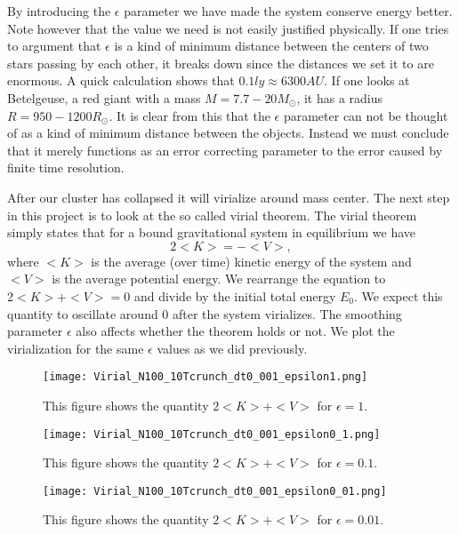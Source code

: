 \documentclass{aa}   %
\begin{document}
By introducing the $\epsilon$ parameter we have made the system conserve energy better. Note however that the value we need is not easily justified physically. If one tries to argument that $\epsilon$ is a kind of minimum distance between the centers of two stars passing by each other, it breaks down since the distances we set it to are enormous. A quick calculation shows that $0.1 ly \approx 6300 AU$. If one looks at Betelgeuse, a red giant with a mass $M = 7.7-20 M_\odot$, it has a radius $R= 950-1200 R_\odot$. It is clear from this that the $\epsilon$ parameter can not be thought of as a kind of minimum distance between the objects. Instead we must conclude that it merely functions as an error correcting parameter to the error caused by finite time resolution. 

After our cluster has collapsed it will virialize around mass center.
The next step in this project is to look at the so called virial theorem.
The virial theorem simply states that for a bound gravitational system in equilibrium we have 
\begin{equation}
 2<K> = -<V>,
\end{equation}
where $<K>$ is the average (over time) kinetic energy of the system and $<V>$ is the average potential energy. We rearrange the equation to $2<K> + <V> = 0$ and divide by the initial total energy $E_0$. We expect this quantity to oscillate around 0 after the system virializes.
The smoothing parameter $\epsilon$ also affects whether the  theorem holds or not. We plot the virialization for the same $\epsilon$ values as we did previously. 

\begin{figure}[hbtp]
 \centering
 \texttt{[image: Virial\_N100\_10Tcrunch\_dt0\_001\_epsilon1.png]}
 \caption[]{\label{Virial_N100_10Tcrunch_dt0_001_epsilon1}
   This figure shows the quantity $2<K> + <V>$ for $\epsilon = 1$.
 }
\end{figure}


\begin{figure}[hbtp]
 \centering
 \texttt{[image: Virial\_N100\_10Tcrunch\_dt0\_001\_epsilon0\_1.png]}
 \caption[]{\label{Virial_N100_10Tcrunch_dt0_001_epsilon0_1}
   This figure shows the quantity $2<K> + <V>$ for $\epsilon = 0.1$.
 }
\end{figure}

\begin{figure}[hbtp]
 \centering
 \texttt{[image: Virial\_N100\_10Tcrunch\_dt0\_001\_epsilon0\_01.png]}
 \caption[]{\label{Virial_N100_10Tcrunch_dt0_001_epsilon0_01}
   This figure shows the quantity $2<K> + <V>$ for $\epsilon = 0.01$.
 }
\end{figure}
\end{document}
